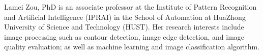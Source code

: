 \documentclass[journal]{IEEEtran}
\begin{document}
\begin{IEEEbiography}{Lamei Zou, PhD} is an associate professor at the Institute of Pattern Recognition and Artificial Intelligence (IPRAI) in the  School of Automation at HuaZhong University of Science and Technology (HUST). Her research interests include image processing such as contour detection, image edge detection, and image quality evaluation; as well as machine learning and image classification algorithm.
\end{IEEEbiography}



\end{document}
